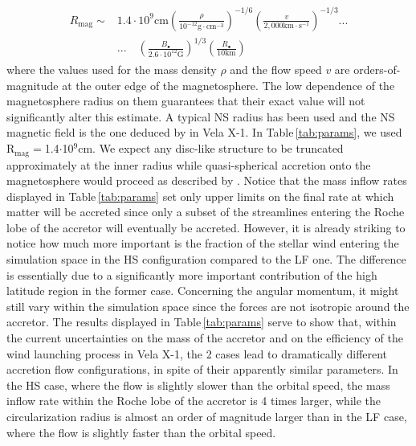 \documentclass{aa}
\makeatletter
\newcommand*{\ns}{NS\@\xspace}
\makeatother
\begin{document}
\begin{align}
\begin{split}
\label{eq:Rmag}
R_{\text{mag}}\sim & 1.4\cdot 10^9\text{cm}\left(\frac{\rho}{10^{-12}\text{g}\cdot\text{cm}^{-3}}\right)^{-1/6}\left(\frac{v}{2,000\text{km}\cdot\text{s}^{-1}}\right)^{-1/3} \text{...}\\
& \text{...} \quad \left(\frac{B_{\bullet}}{2.6\cdot 10^{12}\text{G}}\right)^{1/3}\left(\frac{R_{\bullet}}{10\text{km}}\right)
\end{split}
\end{align}
where the values used for the mass density $\rho$ and the flow speed $v$ are orders-of-magnitude at the outer edge of the magnetosphere. The low dependence of the magnetosphere radius on them guarantees that their exact value will not significantly alter this estimate. A typical \ns radius has been used and the \ns magnetic field is the one deduced by \cite{Furst2014} in Vela X-1. In Table\,\ref{tab:params}, we used R$_{\text{mag}}=$1.4$\cdot$10$^9$cm. We expect any disc-like structure to be truncated approximately at the inner radius \citep{Ghosh1978} while quasi-spherical accretion onto the magnetosphere would proceed as described by \cite{Shakura2013b}. Notice that the mass inflow rates displayed in Table\,\ref{tab:params} set only upper limits on the final rate at which matter will be accreted since only a subset of the streamlines entering the Roche lobe of the accretor will eventually be accreted. However, it is already striking to notice how much more important is the fraction of the stellar wind entering the simulation space in the HS configuration compared to the LF one. The difference is essentially due to a significantly more important contribution of the high latitude region in the former case. Concerning the angular momentum, it might still vary within the simulation space since the forces are not isotropic around the accretor. The results displayed in Table\,\ref{tab:params} serve to show that, within the current uncertainties on the mass of the accretor and on the efficiency of the wind launching process in Vela X-1, the 2 cases lead to dramatically different accretion flow configurations, in spite of their apparently similar parameters. In the HS case, where the flow is slightly slower than the orbital speed, the mass inflow rate within the Roche lobe of the accretor is 4 times larger, while the circularization radius is almost an order of magnitude larger than in the LF case, where the flow is slightly faster than the orbital speed. 
\end{document}
